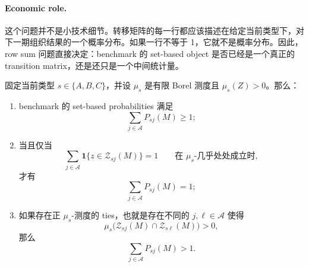 \paragraph{Economic role.}
这个问题并不是小技术细节。转移矩阵的每一行都应该描述在给定当前类型下，对下一期组织结果的一个概率分布。如果一行不等于 1，它就不是概率分布。因此，row sum 问题直接决定：benchmark 的 set-based object 是否已经是一个真正的 transition matrix，还是还只是一个中间统计量。

\begin{proposition}
固定当前类型 $s\in\{A,B,C\}$，并设 $\mu_s$ 是有限 Borel 测度且 $\mu_s(Z)>0$。那么：
\begin{enumerate}
    \item benchmark 的 set-based probabilities 满足
    \[
    \sum_{j\in\mathcal A}P_{sj}(M)\ge 1;
    \]
    \item 当且仅当
    \[
    \sum_{j\in\mathcal A}\mathbf 1\{z\in\mathcal Z_{sj}(M)\}=1
    \qquad\text{在 }\mu_s\text{-几乎处处成立时},
    \]
    才有
    \[
    \sum_{j\in\mathcal A}P_{sj}(M)=1;
    \]
    \item 如果存在正 $\mu_s$-测度的 ties，也就是存在不同的 $j,\ell\in\mathcal A$ 使得
    \[
    \mu_s\bigl(\mathcal Z_{sj}(M)\cap \mathcal Z_{s\ell}(M)\bigr)>0,
    \]
    那么
    \[
    \sum_{j\in\mathcal A}P_{sj}(M)>1.
    \]
\end{enumerate}
\end{proposition}

